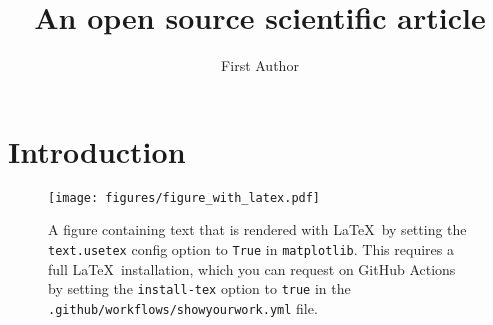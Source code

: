 \documentclass[twocolumn]{aastex631}
\begin{document}
\title{An open source scientific article}

\author{First Author}

\begin{abstract}
    \blindtext
\end{abstract}

\section{Introduction}

\blindtext

\begin{figure}[ht!]
    \begin{centering}
        \texttt{[image: figures/figure\_with\_latex.pdf]}
        \caption{
            A figure containing text that is rendered with \LaTeX\, by setting
            the \texttt{text.usetex} config option to \texttt{True} in 
            \texttt{matplotlib}. This requires a full \LaTeX\, installation, which
            you can request on GitHub Actions by setting the \texttt{install-tex}
            option to \texttt{true} in the \texttt{.github/workflows/showyourwork.yml}
            file.
        }
        \label{fig:figure_with_latex}
    \end{centering}
\end{figure}
\end{document}
